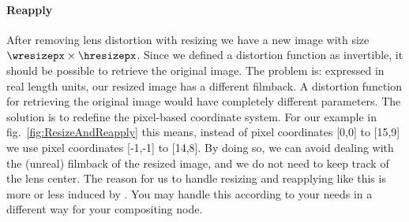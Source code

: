\documentclass[10pt,a4paper]{article}
\begin{document}
\paragraph{Reapply}
After removing lens distortion with resizing we have a new image with size
$\wresizepx\times\hresizepx$.
Since we defined a distortion function as invertible, it should be possible
to retrieve the original image.
The problem is: expressed in real length units, our resized image has
a different filmback.
A distortion function for retrieving the original image would have
completely different parameters.
The solution is to redefine the pixel-based coordinate system.
For our example in fig.~\ref{fig:ResizeAndReapply} this means,
instead of pixel coordinates [0,0] to [15,9] we use pixel coordinates [-1,-1] to [14,8].
By doing so, we can avoid dealing with the (unreal) filmback of the resized image,
and we do not need to keep track of the lens center.
The reason for us to handle resizing and reapplying like this is
more or less induced by \warp. You may handle this according to your needs
in a different way for your compositing node.
\end{document}
